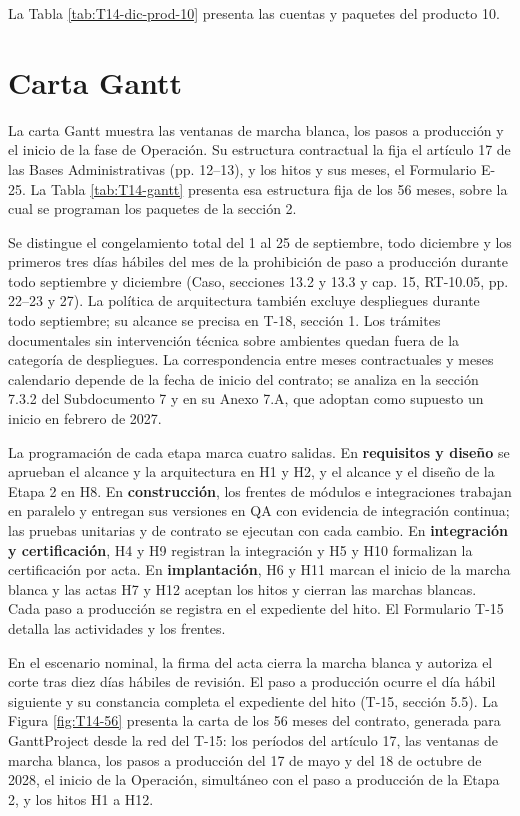 La Tabla \ref{tab:T14-dic-prod-10} presenta las cuentas y paquetes del producto 10.

\section{Carta Gantt}

La carta Gantt muestra las ventanas de marcha blanca, los pasos a producción y el inicio de la fase de Operación. Su estructura contractual la fija el artículo 17 de las Bases Administrativas (pp. 12--13), y los hitos y sus meses, el Formulario E-25. La Tabla \ref{tab:T14-gantt} presenta esa estructura fija de los 56 meses, sobre la cual se programan los paquetes de la sección 2.


Se distingue el congelamiento total del 1 al 25 de septiembre, todo diciembre y los primeros tres días hábiles del mes de la prohibición de paso a producción durante todo septiembre y diciembre (Caso, secciones 13.2 y 13.3 y cap. 15, RT-10.05, pp. 22--23 y 27). La política de arquitectura también excluye despliegues durante todo septiembre; su alcance se precisa en T-18, sección 1. Los trámites documentales sin intervención técnica sobre ambientes quedan fuera de la categoría de despliegues. La correspondencia entre meses contractuales y meses calendario depende de la fecha de inicio del contrato; se analiza en la sección 7.3.2 del Subdocumento 7 y en su Anexo 7.A, que adoptan como supuesto un inicio en febrero de 2027.

La programación de cada etapa marca cuatro salidas. En \textbf{requisitos y diseño} se aprueban el alcance y la arquitectura en H1 y H2, y el alcance y el diseño de la Etapa 2 en H8. En \textbf{construcción}, los frentes de módulos e integraciones trabajan en paralelo y entregan sus versiones en QA con evidencia de integración continua; las pruebas unitarias y de contrato se ejecutan con cada cambio. En \textbf{integración y certificación}, H4 y H9 registran la integración y H5 y H10 formalizan la certificación por acta. En \textbf{implantación}, H6 y H11 marcan el inicio de la marcha blanca y las actas H7 y H12 aceptan los hitos y cierran las marchas blancas. Cada paso a producción se registra en el expediente del hito. El Formulario T-15 detalla las actividades y los frentes.

En el escenario nominal, la firma del acta cierra la marcha blanca y autoriza el corte tras diez días hábiles de revisión. El paso a producción ocurre el día hábil siguiente y su constancia completa el expediente del hito (T-15, sección 5.5). La Figura \ref{fig:T14-56} presenta la carta de los 56 meses del contrato, generada para GanttProject desde la red del T-15: los períodos del artículo 17, las ventanas de marcha blanca, los pasos a producción del 17 de mayo y del 18 de octubre de 2028, el inicio de la Operación, simultáneo con el paso a producción de la Etapa 2, y los hitos H1 a H12.

